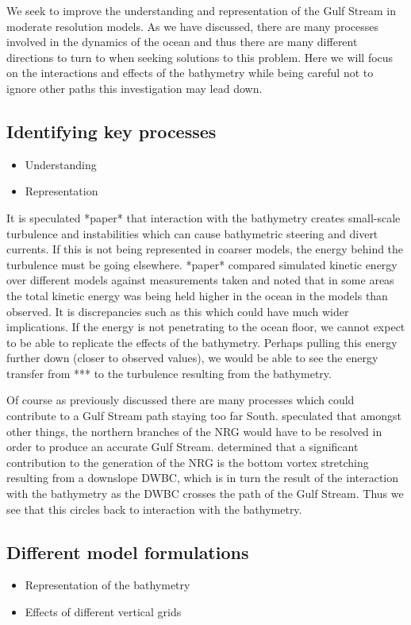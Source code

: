 \documentclass[a4paper,11pt]{article}
\begin{document}
We seek to improve the understanding and representation of the Gulf Stream in moderate resolution models. As we have discussed, there are many processes involved in the dynamics of the ocean and thus there are many different directions to turn to when seeking solutions to this problem. Here we will focus on the interactions and effects of the bathymetry while being careful not to ignore other paths this investigation may lead down. 

\subsection{Identifying key processes}
\begin{itemize}
  \item Understanding
  \item Representation
\end{itemize}

It is speculated *paper* that interaction with the bathymetry creates small-scale turbulence and instabilities which can cause bathymetric steering and divert currents. If this is not being represented in coarser models, the energy behind the turbulence must be going elsewhere. *paper* compared simulated kinetic energy over different models against measurements taken and noted that in some areas the total kinetic energy was being held higher in the ocean in the models than observed. It is discrepancies  such as this which could have much wider implications. If the energy is not penetrating to the ocean floor, we cannot expect to be able to replicate the effects of the bathymetry. Perhaps pulling this energy further down (closer to observed values), we would be able to see the energy transfer from *** to the turbulence resulting from the bathymetry. 

Of course as previously discussed there are many processes which could contribute to a Gulf Stream path staying too far South. \citep{Ezer2016b} speculated that amongst other things, the northern branches of the NRG would have to be resolved in order to produce an accurate Gulf Stream. \citep{Zhang2007} determined that a significant contribution to the generation of the NRG is the bottom vortex stretching resulting from a downslope DWBC, which is in turn the result of the interaction with the bathymetry as the DWBC crosses the path of the Gulf Stream. Thus we see that this circles back to interaction with the bathymetry.


\subsection{Different model formulations}
\begin{itemize}
  \item Representation of the bathymetry
  \item Effects of different vertical grids
\end{itemize}
\end{document}
